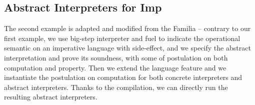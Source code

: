 \subsection{Abstract Interpreters for Imp}
The second example is adapted and modified from the Familia\citep{zhang2017familia}
-- contrary to our first example, we use big-step interpreter and fuel to indicate the operational semantic on an imperative language with side-effect, and we specify the abstract interpretation and prove its soundness, with some of postulation on both computation and property. Then we extend the language feature and we instantiate the postulation on computation for both concrete interpreters and abstract interpreters. Thanks to the compilation, we can directly run the resulting abstract interpreters.